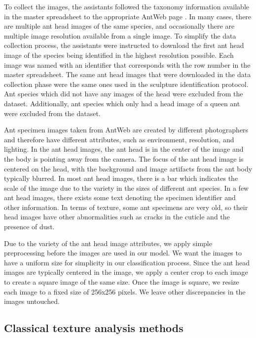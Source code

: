 \documentclass{aci}
\numberwithin{equation}{section}
\begin{document}
To collect the images, the assistants followed the taxonomy information
available in the master spreadsheet to the appropriate AntWeb page
\cite{perrichot_antweb_2012}. In many cases, there are multiple ant head images
of the same species, and occasionally there are multiple image resolution
available from a single image. To simplify the data collection process, the
assistants were instructed to download the first ant head image of the species
being identified in the highest resolution possible. Each image was named with
an identifier that corresponds with the row number in the master spreadsheet.
The same ant head images that were downloaded in the data collection phase were
the same ones used in the sculpture identification protocol. Ant species which
did not have any images of the head were excluded from the dataset.
Additionally, ant species which only had a head image of a queen ant were
excluded from the dataset.

Ant specimen images taken from AntWeb \cite{perrichot_antweb_2012} are created
by different photographers and therefore have different attributes, such as
environment, resolution, and lighting. In the ant head images, the ant head is
in the center of the image and the body is pointing away from the camera. The
focus of the ant head image is centered on the head, with the background and
image artifacts from the ant body typically blurred. In most ant head images,
there is a bar which indicates the scale of the image due to the variety in the
sizes of different ant species. In a few ant head images, there exists some text
denoting the specimen identifier and other information. In terms of texture,
some ant specimens are very old, so their head images have other abnormalities
such as cracks in the cuticle and the presence of dust.

Due to the variety of the ant head image attributes, we apply simple
preprocessing before the images are used in our model. We want the images to
have a uniform size for simplicity in our classification process. Since the ant
head images are typically centered in the image, we apply a center crop to each
image to create a square image of the same size. Once the image is square, we
resize each image to a fixed size of 256x256 pixels. We leave other
discrepancies in the images untouched.



\subsection{Classical texture analysis methods}
\end{document}
